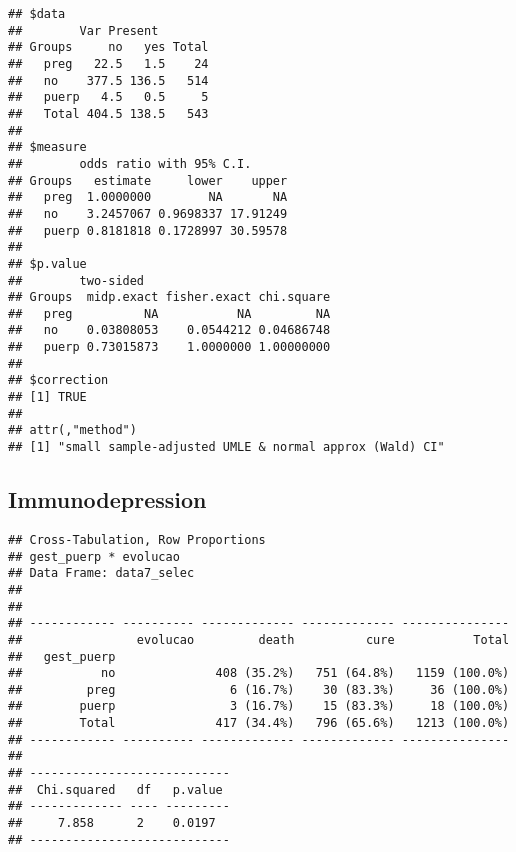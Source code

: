 \documentclass[
]{article}
\newenvironment{Shaded}{\begin{snugshade}}{\end{snugshade}}
\newcommand{\DataTypeTok}[1]{\textcolor[rgb]{0.13,0.29,0.53}{#1}}
\newcommand{\KeywordTok}[1]{\textcolor[rgb]{0.13,0.29,0.53}{\textbf{#1}}}
\newcommand{\NormalTok}[1]{#1}
\newcommand{\OperatorTok}[1]{\textcolor[rgb]{0.81,0.36,0.00}{\textbf{#1}}}
\newcommand{\OtherTok}[1]{\textcolor[rgb]{0.56,0.35,0.01}{#1}}
\newcommand{\StringTok}[1]{\textcolor[rgb]{0.31,0.60,0.02}{#1}}
\begin{document}
\begin{verbatim}
## $data
##        Var Present
## Groups     no   yes Total
##   preg   22.5   1.5    24
##   no    377.5 136.5   514
##   puerp   4.5   0.5     5
##   Total 404.5 138.5   543
## 
## $measure
##        odds ratio with 95% C.I.
## Groups   estimate     lower    upper
##   preg  1.0000000        NA       NA
##   no    3.2457067 0.9698337 17.91249
##   puerp 0.8181818 0.1728997 30.59578
## 
## $p.value
##        two-sided
## Groups  midp.exact fisher.exact chi.square
##   preg          NA           NA         NA
##   no    0.03808053    0.0544212 0.04686748
##   puerp 0.73015873    1.0000000 1.00000000
## 
## $correction
## [1] TRUE
## 
## attr(,"method")
## [1] "small sample-adjusted UMLE & normal approx (Wald) CI"
\end{verbatim}

\hypertarget{immunodepression}{%
\subsection{Immunodepression}\label{immunodepression}}

\begin{Shaded}
\end{Shaded}

\begin{Shaded}
\end{Shaded}

\begin{verbatim}
## Cross-Tabulation, Row Proportions  
## gest_puerp * evolucao  
## Data Frame: data7_selec  
## 
## 
## ------------ ---------- ------------- ------------- ---------------
##                evolucao         death          cure           Total
##   gest_puerp                                                       
##           no              408 (35.2%)   751 (64.8%)   1159 (100.0%)
##         preg                6 (16.7%)    30 (83.3%)     36 (100.0%)
##        puerp                3 (16.7%)    15 (83.3%)     18 (100.0%)
##        Total              417 (34.4%)   796 (65.6%)   1213 (100.0%)
## ------------ ---------- ------------- ------------- ---------------
## 
## ----------------------------
##  Chi.squared   df   p.value 
## ------------- ---- ---------
##     7.858      2    0.0197  
## ----------------------------
\end{verbatim}
\end{document}
